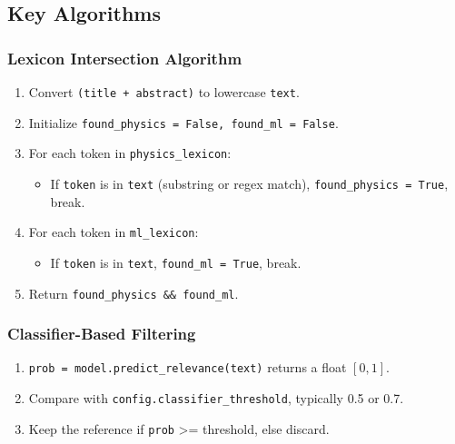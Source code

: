 \documentclass[12pt]{article}
\begin{document}
\subsection{Key Algorithms}

\subsubsection{Lexicon Intersection Algorithm}
\begin{enumerate}
  \item Convert \texttt{(title + abstract)} to lowercase \texttt{text}. 
  \item Initialize \texttt{found\_physics = False, found\_ml = False}.
  \item For each token in \texttt{physics\_lexicon}:
    \begin{itemize}
      \item If \texttt{token} is in \texttt{text} (substring or regex match), \texttt{found\_physics = True}, break.
    \end{itemize}
  \item For each token in \texttt{ml\_lexicon}:
    \begin{itemize}
      \item If \texttt{token} is in \texttt{text}, \texttt{found\_ml = True}, break.
    \end{itemize}
  \item Return \texttt{found\_physics \&\& found\_ml}.
\end{enumerate}

\subsubsection{Classifier-Based Filtering}
\begin{enumerate}
  \item \texttt{prob = model.predict\_relevance(text)} returns a float \([0, 1]\).
  \item Compare with \texttt{config.classifier\_threshold}, typically 0.5 or 0.7.
  \item Keep the reference if \texttt{prob} >= threshold, else discard.
\end{enumerate}
\end{document}

